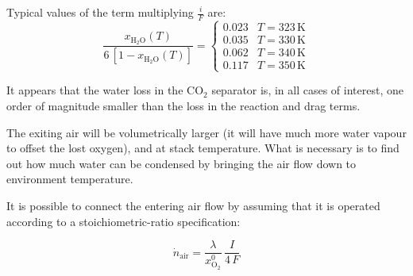 \documentclass[a4paper,10pt]{article}
\newcommand{\HHO}{\ensuremath{\mathrm{H_2O}}}
\newcommand{\OO}{\ensuremath{\mathrm{O_2}}}
\newcommand{\COO}{\ensuremath{\mathrm{CO_2}}}
\begin{document}
Typical values of the term multiplying $\frac{i}{F}$ are:
\begin{equation}
\frac{x_\HHO(T)}{6\,[1-x_\HHO(T)]} =
\begin{cases}
0.023 & T = 323\,\mathrm{K}\\
0.035 & T = 330\,\mathrm{K}\\
0.062 & T = 340\,\mathrm{K}\\
0.117 & T = 350\,\mathrm{K}
\end{cases}
\end{equation}

It appears that the water loss in the \COO{} separator is, in all cases of
interest, one order of magnitude smaller than the loss in the reaction and
drag terms.

The exiting air will be volumetrically larger (it will have much more water
vapour to offset the lost oxygen), and at stack temperature. What is necessary
is to find out how much water can be condensed by bringing the air flow down to
environment temperature.

It is possible to connect the entering air flow by assuming that it is operated
according to a stoichiometric-ratio specification:

\begin{equation}
\dot n_\text{air} = \frac{\lambda}{x_\OO^0}\, \frac{I}{4\,F}
\end{equation}
\end{document}
